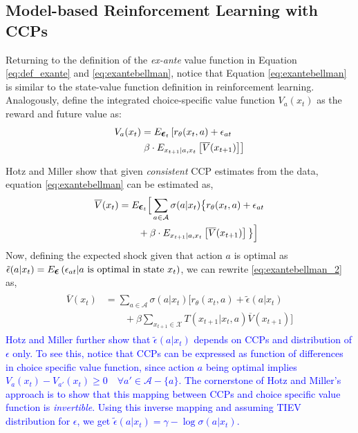 \documentclass{article}
\renewcommand{\vec}[1]{\mbox{\bm{$#1$}}}
\begin{document}
\subsection{Model-based Reinforcement Learning with CCPs}

Returning to the definition of the \emph{ex-ante} value function in Equation \eqref{eq:def_exante} and \eqref{eq:exantebellman}, notice that Equation \eqref{eq:exantebellman} is similar to the state-value function definition in reinforcement learning. 
Analogously, define the integrated choice-specific value function $V_a(x_t)$ as the reward and future value as:
\begin{align}
\begin{split}
V_a(x_t) &= E_{\vec{\epsilon}_t}\left[r_{\theta}(x_t,a)+\epsilon_{at}\right.\\
&
\left.\beta\cdot E_{x_{t+1}|a,x_t} \left[ \overline{V}(x_{t+1}) \right] \right]
\end{split}
\end{align}

Hotz and Miller  show that given \textit{consistent} CCP estimates from the data, equation \eqref{eq:exantebellman} can be estimated as,
\begin{align} \label{eq:exantebellman_2}
\begin{split}
\overline{V}(x_t) & = E_{\vec{\epsilon}_t}\Big[\sum_{a\in\mathcal{A}} \sigma(a|x_t) \big\{r_{\theta}(x_t,a)+\epsilon_{at} \\
& \qquad +\beta  \cdot E_{x_{t+1}|a,x_t} \left[ \overline{V}(x_{t+1}) \right] \big\}\Big]\\
\end{split}
\end{align}
Now, defining the expected shock given that action $a$ is optimal as $\tilde{\epsilon}(a|x_t) = E_{\vec{\epsilon}}\left( \epsilon_{at} |a\ \textrm{is optimal in state } x_t\right)$, we can rewrite \eqref{eq:exantebellman_2} as,
\begin{align} \label{eq:exantebellman_3}
\begin{split}
\overline{V}(x_t) & = \sum_{a\in\mathcal{A}} \sigma(a|x_t) \Big[r_{\theta}(x_t,a)+\tilde{\epsilon}(a|x_t) \\
& \qquad +\beta \sum_{x_{t+1}\in\mathcal{X}} T(x_{t+1}|x_t,a) \overline{V}(x_{t+1})\Big]
\end{split}
\end{align}
\textcolor{blue}{
Hotz and Miller  further show that $\tilde{\epsilon}(a|x_t)$ depends on CCPs and distribution of $\epsilon$ only.
To see this, notice that CCPs can be expressed as function of differences in choice specific value function, since action $a$ being optimal implies $V_a(x_t)- V_{a'}(x_t)\geq 0 \quad\forall a'\in\mathcal{A} - \{a\}$. The cornerstone of Hotz and Miller's approach is to show that this mapping between CCPs and choice specific value function is \emph{invertible}. Using this inverse mapping and assuming TIEV distribution for $\epsilon$, we get $\tilde{\epsilon}(a|x_t) = \gamma - \log \sigma(a|x_t)$.
}
\end{document}
